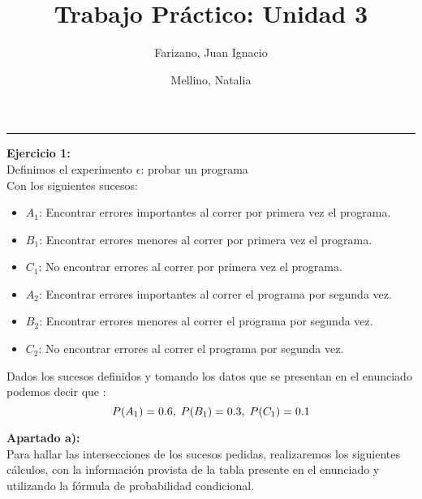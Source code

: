 \documentclass[11pt]{article}
\title{
  Trabajo Práctico: Unidad 3
}
\author{
  Farizano, Juan Ignacio\\
  \and
  Mellino, Natalia
}
\date{}
\begin{document}
\maketitle
\noindent\rule{\textwidth}{1pt}


\begin{justify}
  \textbf{Ejercicio 1:} \\
  Definimos el experimento $\epsilon$: probar un programa \\
  Con los siguientes sucesos:
  \begin{itemize}
    \item $A_1$: Encontrar errores importantes al correr por primera vez el programa.
    \item $B_1$: Encontrar errores menores al  correr por primera vez el programa.
    \item $C_1$: No encontrar errores al correr por primera vez el programa.
 
    \item $A_2$: Encontrar errores importantes al correr el programa por segunda vez.
    \item $B_2$: Encontrar errores menores al correr el programa por segunda vez.
    \item $C_2$: No encontrar errores al correr el programa por segunda vez.
  \end{itemize}
    Dados los sucesos definidos y tomando los datos que se presentan en el 
    enunciado podemos decir que :
  \begin{equation*}
  P(A_1) = 0.6,\; P(B_1) = 0.3,\; P(C_1) = 0.1 \\
  \end{equation*}
\end{justify}


\begin{justify}
  \textbf{Apartado a):} \\
  Para hallar las intersecciones de los sucesos pedidas, realizaremos los 
  siguientes cálculos, con la información provista de la tabla presente en el
  enunciado y utilizando la fórmula de probabilidad condicional.
\end{justify}
\end{document}
